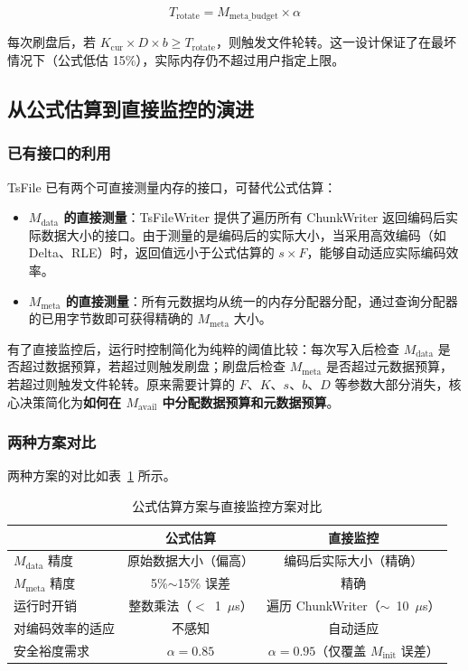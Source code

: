 \begin{equation}
  T_{\text{rotate}} = M_{\text{meta\_budget}} \times \alpha
  \label{eq:rotate-thresh}
\end{equation}

每次刷盘后，若 $K_{\text{cur}} \times D \times b \geq T_{\text{rotate}}$，则触发文件轮转。这一设计保证了在最坏情况下（公式低估 15\%），实际内存仍不超过用户指定上限。

\subsection{从公式估算到直接监控的演进}

\subsubsection{已有接口的利用}

TsFile 已有两个可直接测量内存的接口，可替代公式估算：

\begin{itemize}
  \item \textbf{$M_{\text{data}}$ 的直接测量}：TsFileWriter 提供了遍历所有 ChunkWriter 返回编码后实际数据大小的接口。由于测量的是编码后的实际大小，当采用高效编码（如 Delta、RLE）时，返回值远小于公式估算的 $s \times F$，能够自动适应实际编码效率。
  \item \textbf{$M_{\text{meta}}$ 的直接测量}：所有元数据均从统一的内存分配器分配，通过查询分配器的已用字节数即可获得精确的 $M_{\text{meta}}$ 大小。
\end{itemize}

有了直接监控后，运行时控制简化为纯粹的阈值比较：每次写入后检查 $M_{\text{data}}$ 是否超过数据预算，若超过则触发刷盘；刷盘后检查 $M_{\text{meta}}$ 是否超过元数据预算，若超过则触发文件轮转。原来需要计算的 $F$、$K$、$s$、$b$、$D$ 等参数大部分消失，核心决策简化为\textbf{如何在 $M_{\text{avail}}$ 中分配数据预算和元数据预算}。

\subsubsection{两种方案对比}

两种方案的对比如表~\ref{tab:formula-vs-monitor} 所示。

\begin{table}[htbp]
  \centering
  \caption{公式估算方案与直接监控方案对比}
  \label{tab:formula-vs-monitor}
  \begin{tabular}{lcc}
    \toprule
     & 公式估算 & 直接监控 \\
    \midrule
    $M_{\text{data}}$ 精度 & 原始数据大小（偏高） & 编码后实际大小（精确） \\
    $M_{\text{meta}}$ 精度 & 5\%$\sim$15\% 误差 & 精确 \\
    运行时开销 & 整数乘法（$<$~1~$\mu$s） & 遍历 ChunkWriter（$\sim$~10~$\mu$s） \\
    对编码效率的适应 & 不感知 & 自动适应 \\
    安全裕度需求 & $\alpha = 0.85$ & $\alpha = 0.95$（仅覆盖 $M_{\text{init}}$ 误差） \\
    \bottomrule
  \end{tabular}
\end{table}

